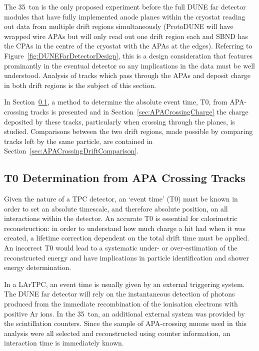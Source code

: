 The 35~ton is the only proposed experiment before the full DUNE far detector modules that have fully implemented anode planes within the cryostat reading out data from multiple drift regions simultaneously (ProtoDUNE will have wrapped wire APAs but will only read out one drift region each and SBND has the CPAs in the centre of the cryostat with the APAs at the edges).  Referring to Figure~\ref{fig:DUNEFarDetectorDesign}, this is a design consideration that features prominantly in the eventual detector so any implications in the data must be well understood.  Analysis of tracks which pass through the APAs and deposit charge in both drift regions is the subject of this section.

In Section~\ref{sec:APACrossingT0}, a method to determine the absolute event time, T0, from APA-crossing tracks is presented and in Section~\ref{sec:APACrossingCharge} the charge deposited by these tracks, particularly when crossing through the planes, is studied.  Comparisons between the two drift regions, made possible by comparing tracks left by the same particle, are contained in Section~\ref{sec:APACrossingDriftComparison}.

\subsection{T0 Determination from APA Crossing Tracks}\label{sec:APACrossingT0}

Given the nature of a TPC detector, an `event time' (T0) must be known in order to set an absolute timescale, and therefore absolute position, on all interactions within the detector.  An accurate T0 is essential for calorimetric reconstruction: in order to understand how much charge a hit had when it was created, a lifetime correction dependent on the total drift time must be applied.  An incorrect T0 would lead to a systematic under- or over-estimation of the reconstructed energy and have implications in particle identification and shower energy determination.

In a LArTPC, an event time is usually given by an external triggering system.  The DUNE far detector will rely on the instantaneous detection of photons produced from the immediate recombination of the ionisation electrons with positive Ar ions.  In the 35~ton, an additional external system was provided by the scintillation counters.  Since the sample of APA-crossing muons used in this analysis were all selected and reconstructed using counter information, an interaction time is immediately known.

